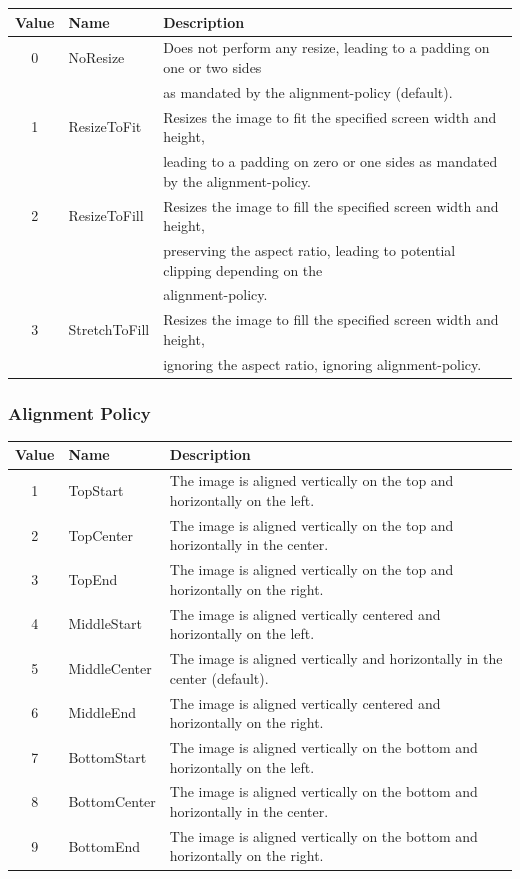 \documentclass[a4paper]{article}
\begin{document}
\begin{tabular}{ |c|l|l| }
    \hline
    \textbf{Value} & \textbf{Name}          & \textbf{Description} \\
    \hline
    0 & NoResize      & Does not perform any resize, leading to a padding on one or two sides \\
      &               & as mandated by the alignment-policy (default). \\
    1 & ResizeToFit   & Resizes the image to fit the specified screen width and height, \\
      &               & leading to a padding on zero or one sides as mandated by the alignment-policy. \\
    2 & ResizeToFill  & Resizes the image to fill the specified screen width and height, \\
      &               & preserving the aspect ratio, leading to potential clipping depending on the \\
      &               & alignment-policy. \\
    3 & StretchToFill & Resizes the image to fill the specified screen width and height, \\
      &               & ignoring the aspect ratio, ignoring alignment-policy. \\
    \hline
\end{tabular}

\subsubsection*{Alignment Policy}

\begin{tabular}{ |c|l|l| }
    \hline
    \textbf{Value} & \textbf{Name}          & \textbf{Description} \\
    \hline
    1 & TopStart      & The image is aligned vertically on the top and horizontally on the left. \\
    2 & TopCenter     & The image is aligned vertically on the top and horizontally in the center. \\
    3 & TopEnd        & The image is aligned vertically on the top and horizontally on the right. \\
    \hline
    4 & MiddleStart   & The image is aligned vertically centered and horizontally on the left. \\
    5 & MiddleCenter  & The image is aligned vertically and horizontally in the center (default). \\
    6 & MiddleEnd     & The image is aligned vertically centered and horizontally on the right. \\
    \hline
    7 & BottomStart   & The image is aligned vertically on the bottom and horizontally on the left. \\
    8 & BottomCenter  & The image is aligned vertically on the bottom and horizontally in the center. \\
    9 & BottomEnd     & The image is aligned vertically on the bottom and horizontally on the right. \\
    \hline
\end{tabular}
\end{document}
